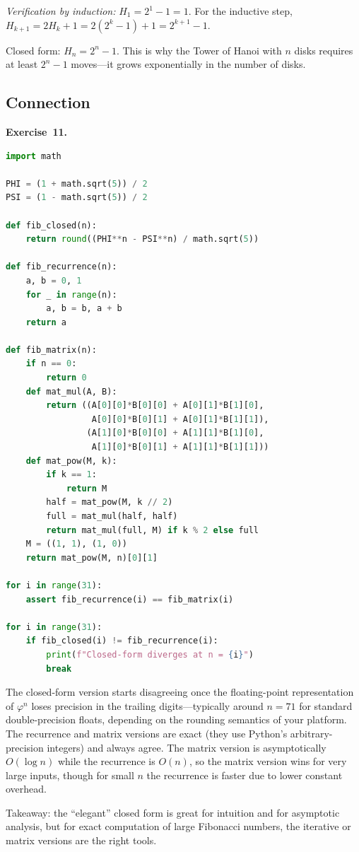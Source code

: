 \documentclass[11pt]{article}
\begin{document}
\emph{Verification by induction:} $H_1 = 2^1 - 1 = 1$. \checkmark For the inductive step, $H_{k+1} = 2 H_k + 1 = 2(2^k - 1) + 1 = 2^{k+1} - 1$. \checkmark

Closed form: $H_n = 2^n - 1$. This is why the Tower of Hanoi with $n$ disks requires at least $2^n - 1$ moves---it grows exponentially in the number of disks.

\subsection*{Connection}

\textbf{Exercise~11.}
\begin{lstlisting}[language=Python]
import math

PHI = (1 + math.sqrt(5)) / 2
PSI = (1 - math.sqrt(5)) / 2

def fib_closed(n):
    return round((PHI**n - PSI**n) / math.sqrt(5))

def fib_recurrence(n):
    a, b = 0, 1
    for _ in range(n):
        a, b = b, a + b
    return a

def fib_matrix(n):
    if n == 0:
        return 0
    def mat_mul(A, B):
        return ((A[0][0]*B[0][0] + A[0][1]*B[1][0],
                 A[0][0]*B[0][1] + A[0][1]*B[1][1]),
                (A[1][0]*B[0][0] + A[1][1]*B[1][0],
                 A[1][0]*B[0][1] + A[1][1]*B[1][1]))
    def mat_pow(M, k):
        if k == 1:
            return M
        half = mat_pow(M, k // 2)
        full = mat_mul(half, half)
        return mat_mul(full, M) if k % 2 else full
    M = ((1, 1), (1, 0))
    return mat_pow(M, n)[0][1]

for i in range(31):
    assert fib_recurrence(i) == fib_matrix(i)

for i in range(31):
    if fib_closed(i) != fib_recurrence(i):
        print(f"Closed-form diverges at n = {i}")
        break
\end{lstlisting}
The closed-form version starts disagreeing once the floating-point representation of $\varphi^n$ loses precision in the trailing digits---typically around $n = 71$ for standard double-precision floats, depending on the rounding semantics of your platform. The recurrence and matrix versions are exact (they use Python's arbitrary-precision integers) and always agree. The matrix version is asymptotically $O(\log n)$ while the recurrence is $O(n)$, so the matrix version wins for very large inputs, though for small $n$ the recurrence is faster due to lower constant overhead.

Takeaway: the ``elegant'' closed form is great for intuition and for asymptotic analysis, but for exact computation of large Fibonacci numbers, the iterative or matrix versions are the right tools.
\end{document}
